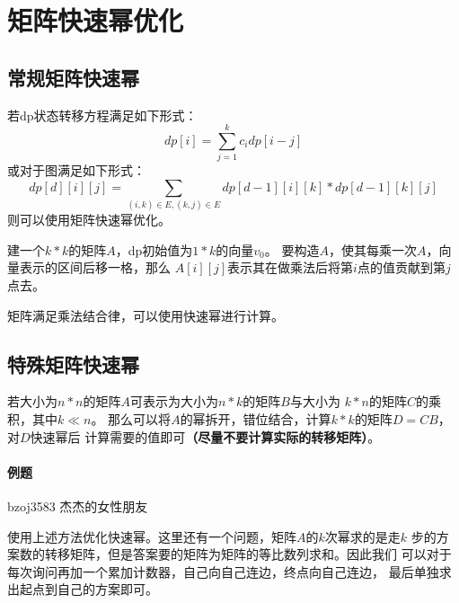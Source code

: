 \section{矩阵快速幂优化}
\subsection{常规矩阵快速幂}
若dp状态转移方程满足如下形式：
\begin{displaymath}
    dp[i]=\sum_{j=1}^k{c_idp[i-j]}
\end{displaymath}
或对于图满足如下形式：
\begin{displaymath}
    dp[d][i][j]=\sum_{(i,k)\in E,(k,j)\in E}{dp[d-1][i][k]*dp[d-1][k][j]}
\end{displaymath}
则可以使用矩阵快速幂优化。

建一个$k*k$的矩阵$A$，dp初始值为$1*k$的向量$v_0$。
要构造$A$，使其每乘一次$A$，向量表示的区间后移一格，那么
$A[i][j]$表示其在做乘法后将第$i$点的值贡献到第$j$点去。

矩阵满足乘法结合律，可以使用快速幂进行计算。

\subsection{特殊矩阵快速幂}

若大小为$n*n$的矩阵$A$可表示为大小为$n*k$的矩阵$B$与大小为
$k*n$的矩阵$C$的乘积，其中$k\ll n$。
那么可以将$A$的幂拆开，错位结合，计算$k*k$的矩阵$D=CB$，对$D$快速幂后
计算需要的值即可{\bfseries （尽量不要计算实际的转移矩阵）}。

\paragraph{例题} bzoj3583 杰杰的女性朋友

使用上述方法优化快速幂。这里还有一个问题，矩阵$A$的$k$次幂求的是走$k$
步的方案数的转移矩阵，但是答案要的矩阵为矩阵的等比数列求和。因此我们
可以对于每次询问再加一个累加计数器，自己向自己连边，终点向自己连边，
最后单独求出起点到自己的方案即可。
